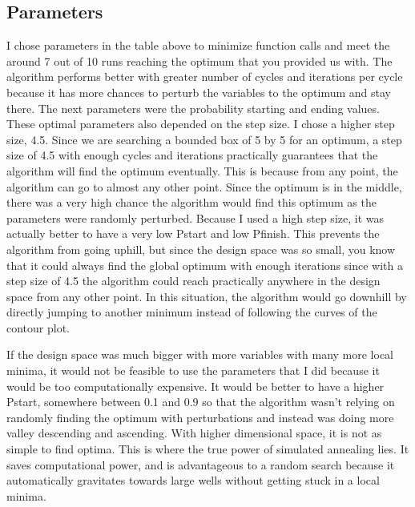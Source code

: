 \documentclass[a4paper]{article}
\begin{document}
    \subsection{Parameters}
    I chose parameters in the table above to minimize function calls and meet the around 7 out of 10 runs reaching the optimum that you provided us with. 
    The algorithm performs better with greater number of cycles and iterations per cycle because it has more chances to perturb the variables to the optimum and stay there.
    The next parameters were the probability starting and ending values. 
    These optimal parameters also depended on the step size.
    I chose a higher step size, 4.5. 
    Since we are searching a bounded box of 5 by 5 for an optimum, a step size of 4.5 with enough cycles and iterations practically guarantees that the algorithm will find the optimum eventually.
    This is because from any point, the algorithm can go to almost any other point.
    Since the optimum is in the middle, there was a very high chance the algorithm would find this optimum as the parameters were randomly perturbed.
    Because I used a high step size, it was actually better to have a very low Pstart and low Pfinish. 
    This prevents the algorithm from going uphill, but since the design space was so small, you know that it could always find the global optimum with enough iterations since with a step size of 4.5 the algorithm could reach practically anywhere in the design space from any other point.
    In this situation, the algorithm would go downhill by directly jumping to another minimum instead of following the curves of the contour plot.

    If the design space was much bigger with more variables with many more local minima, it would not be feasible to use the parameters that I did because it would be too computationally expensive.
    It would be better to have a higher Pstart, somewhere between 0.1 and 0.9 so that the algorithm wasn't relying on randomly finding the optimum with perturbations and instead was doing more valley descending and ascending.
    With higher dimensional space, it is not as simple to find optima.
    This is where the true power of simulated annealing lies. 
    It saves computational power, and is advantageous to a random search because it automatically gravitates towards large wells without getting stuck in a local minima.
\end{document}
